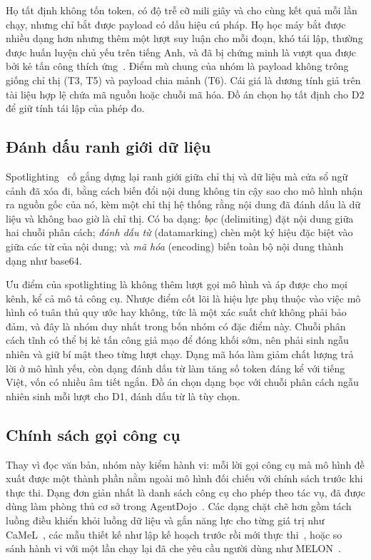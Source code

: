 \documentclass[../DoAn.tex]{subfiles}
\begin{document}
Họ tất định không tốn token, có độ trễ cỡ mili giây và cho cùng kết quả mỗi lần chạy, nhưng chỉ bắt được payload có dấu hiệu cú pháp. Họ học máy bắt được nhiều dạng hơn nhưng thêm một lượt suy luận cho mỗi đoạn, khó tái lập, thường được huấn luyện chủ yếu trên tiếng Anh, và đã bị chứng minh là vượt qua được bởi kẻ tấn công thích ứng~\cite{zhan2025adaptive}. Điểm mù chung của nhóm là payload không trông giống chỉ thị (T3, T5) và payload chia mảnh (T6). Cái giá là dương tính giả trên tài liệu hợp lệ chứa mã nguồn hoặc chuỗi mã hóa. Đồ án chọn họ tất định cho D2 để giữ tính tái lập của phép đo.

\subsection{Đánh dấu ranh giới dữ liệu}
\label{subsection:3.5.2}

Spotlighting~\cite{hines2024spotlighting} cố gắng dựng lại ranh giới giữa chỉ thị và dữ liệu mà cửa sổ ngữ cảnh đã xóa đi, bằng cách biến đổi nội dung không tin cậy sao cho mô hình nhận ra nguồn gốc của nó, kèm một chỉ thị hệ thống rằng nội dung đã đánh dấu là dữ liệu và không bao giờ là chỉ thị. Có ba dạng: \emph{bọc} (delimiting) đặt nội dung giữa hai chuỗi phân cách; \emph{đánh dấu từ} (datamarking) chèn một ký hiệu đặc biệt vào giữa các từ của nội dung; và \emph{mã hóa} (encoding) biến toàn bộ nội dung thành dạng như base64.

Ưu điểm của spotlighting là không thêm lượt gọi mô hình và áp được cho mọi kênh, kể cả mô tả công cụ. Nhược điểm cốt lõi là hiệu lực phụ thuộc vào việc mô hình có tuân thủ quy ước hay không, tức là một xác suất chứ không phải bảo đảm, và đây là nhóm duy nhất trong bốn nhóm có đặc điểm này. Chuỗi phân cách tĩnh có thể bị kẻ tấn công giả mạo để đóng khối sớm, nên phải sinh ngẫu nhiên và giữ bí mật theo từng lượt chạy. Dạng mã hóa làm giảm chất lượng trả lời ở mô hình yếu, còn dạng đánh dấu từ làm tăng số token đáng kể với tiếng Việt, vốn có nhiều âm tiết ngắn. Đồ án chọn dạng bọc với chuỗi phân cách ngẫu nhiên sinh mỗi lượt cho D1, đánh dấu từ là tùy chọn.

\subsection{Chính sách gọi công cụ}
\label{subsection:3.5.3}

Thay vì đọc văn bản, nhóm này kiểm hành vi: mỗi lời gọi công cụ mà mô hình đề xuất được một thành phần nằm ngoài mô hình đối chiếu với chính sách trước khi thực thi. Dạng đơn giản nhất là danh sách công cụ cho phép theo tác vụ, đã được dùng làm phòng thủ cơ sở trong AgentDojo~\cite{debenedetti2024agentdojo}. Các dạng chặt chẽ hơn gồm tách luồng điều khiển khỏi luồng dữ liệu và gắn năng lực cho từng giá trị như CaMeL~\cite{debenedetti2025camel}, các mẫu thiết kế như lập kế hoạch trước rồi mới thực thi~\cite{beurer2025design}, hoặc so sánh hành vi với một lần chạy lại đã che yêu cầu người dùng như MELON~\cite{zhu2025melon}.
\end{document}
